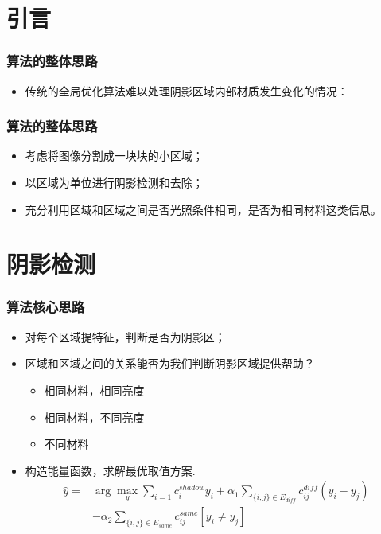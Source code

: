 \section{引言}
\begin{frame}
\frametitle{算法的整体思路}
\begin{itemize}
	\setlength\itemsep{1cm}
	\item 传统的全局优化算法难以处理阴影区域内部材质发生变化的情况：
\end{itemize}
\begin{figure}
\center
\end{figure}

\end{frame}
\begin{frame}
\frametitle{算法的整体思路}
\begin{itemize}
	\item 考虑将图像分割成一块块的小区域；
	\item 以区域为单位进行阴影检测和去除；
	\item 充分利用区域和区域之间是否光照条件相同，是否为相同材料这类信息。
\end{itemize}
\begin{figure}
\begin{minipage}[t]{0.5\linewidth}
\centering
\end{minipage}%
\begin{minipage}[t]{0.5\linewidth}
\centering
\end{minipage}
\end{figure}
\end{frame}

\section{阴影检测}
\begin{frame}
\frametitle{算法核心思路}
\begin{itemize}
	\setlength\itemsep{0.5cm}
	\item 对每个区域提特征，判断是否为阴影区；
	\item 区域和区域之间的关系能否为我们判断阴影区域提供帮助？
	\pause
	\begin{itemize}
		\item 相同材料，相同亮度
		\item 相同材料，不同亮度
		\item 不同材料
	\end{itemize}
	\item 构造能量函数，求解最优取值方案.
\begin{align}
\widehat{y}= & \arg \max_y \sum_{i=1}c_i^{shadow}y_i+\alpha_1\sum_{\{i,j\}\in E_{diff}}c_{ij}^{diff}(y_i-y_j) \\
&  -\alpha_2\sum_{\{i,j\}\in E_{same}}c_{ij}^{same}[y_i\ne y_j]
\end{align}
\end{itemize}
\end{frame}
